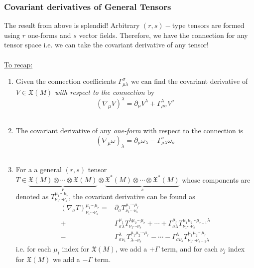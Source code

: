 \documentclass[11pt]{article}
\begin{document}
\subsubsection{Covariant derivatives of General Tensors}
The result from above is splendid! Arbitrary $(r,s)-$type tensors are formed using $r$ one-forms and $s$ vector fields. Therefore, we have the connection for any tensor space i.e. we can take the covariant derivative of any tensor!
\\
\\
\underline{To recap:}
\begin{enumerate}[label=(\alph*)]
  \item Given the connection coefficients $\Gamma_{\mu \lambda}^{\sigma}$ we can find the covariant derivative of $V \in \mathfrak{X}(M)$ \textit{with respect to the connection} by 
  \[ (\nabla_{\mu} V)^{\lambda} = \partial_{\mu} V^{\lambda} + \Gamma_{\mu \sigma}^{\lambda} V^{\sigma}  \]
  \\
  \item The covariant derivative of any \textit{one-form} with respect to the connection is 
  \[ (\nabla_{\mu} \omega)_{\lambda} = \partial_{\mu} \omega_{\lambda} - \Gamma_{\mu \lambda}^{\sigma} \omega_{\sigma} \]
  \\
  \item For a a general $(r,s)$ tensor $T \in \underbrace{\mathfrak{X}(M) \otimes \cdots \otimes \mathfrak{X}(M)}_{r} \otimes \underbrace{\mathfrak{X}^*(M) \otimes \cdots \otimes \mathfrak{X}^*(M)}_{s}$ 
  whose components are denoted as $T^{\mu_1 \cdots \mu_r}_{\nu_1 \cdots \nu_s}$, the covariant derivative can be found as 
  \begin{align*}
    \left(\nabla_{\sigma} T\right)^{\mu_1 \cdots \mu_r}_{\nu_1 \cdots \nu_s} = & \partial_{\sigma} T^{\mu_1 \cdots \mu_r}_{\nu_1 \cdots \nu_s} \\ + &\Gamma_{\sigma \lambda}^{\mu_1}T^{\lambda \mu_2 \cdots \mu_r}_{\nu_1 \cdots \nu_s} + \cdots + \Gamma_{\sigma \lambda}^{\mu_r}T^{\mu_1 \mu_2 \cdots \mu_{r-1} \lambda}_{\nu_1 \cdots \nu_s} \\ - &\Gamma_{\sigma \nu_1}^{\lambda}T^{\mu_1 \mu_2 \cdots \mu_r}_{\lambda \cdots \nu_s} - \cdots - \Gamma_{\sigma \nu_s}^{\lambda}T^{\mu_1 \mu_2 \cdots \mu_r}_{\nu_1 \cdots \nu_{s-1} \lambda} 
  \end{align*}
  i.e. for each $\mu_i$ index for $\mathfrak{X}(M)$, we add a $+\Gamma$ term, and for each $\nu_j$ index for $\mathfrak{X}(M)$ we add a $-\Gamma$ term. 
\end{enumerate}
\end{document}
